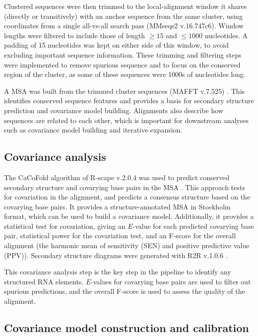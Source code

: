 Clustered sequences were then trimmed to the local-alignment window it shares (directly or transitively) with an anchor sequence from the same cluster, using coordinates from a single all-vs-all search pass (MMseqs2 v.16.747c6).
Window lengths were filtered to include those of length $\geq 15$ and $\leq 1000$ nucleotides.
A padding of 15 nucleotides was kept on either side of this window, to avoid excluding important sequence information.
These trimming and filtering steps were implemented to remove spurious sequence and to focus on the conserved region of the cluster, as some of these sequences were 1000s of nucleotides long.

\label{subsec:rna-alignment}

A \ac{MSA} was built from the trimmed cluster sequences (MAFFT v.7.525) \citep{Katoh2013}.
This identifies conserved sequence features and provides a basis for secondary structure prediction and covariance model building.
Alignments also describe how sequences are related to each other, which is important for downstream analyses such as covariance model building and iterative expansion.

\subsection{Covariance analysis}
\label{subsec:covariance-analysis}

The CaCoFold algorithm of R-scape v.2.0.4 was used to predict conserved secondary structure and covarying base pairs in the \ac{MSA} \citep{Rivas2017}.
This approach tests for covariation in the alignment, and predicts a consensus structure based on the covarying base pairs.
It provides a structure-annotated \ac{MSA} in Stockholm format, which can be used to build a covariance model.
Additionally, it provides a statistical test for covariation, giving an $E$-value for each predicted covarying base pair, statistical power for the covariation test, and an F-score for the overall alignment (the harmonic mean of sensitivity (SEN) and positive predictive value (PPV)).
Secondary structure diagrams were generated with R2R v.1.0.6 \citep{Weinberg2011}.

This covariance analysis step is the key step in the pipeline to identify any structured RNA elements.
$E$-values for covarying base pairs are used to filter out spurious predictions, and the overall F-score is used to assess the quality of the alignment.

\subsection{Covariance model construction and calibration}
\label{sec:build_cm}

